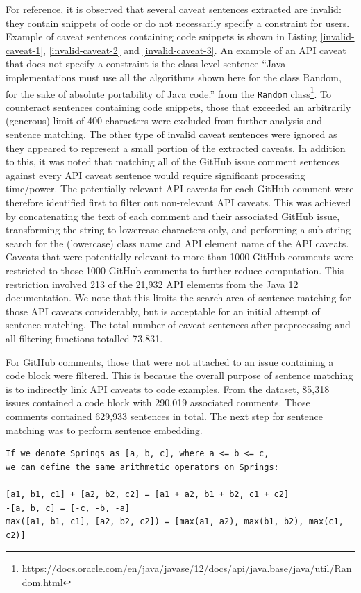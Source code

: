 For reference, it is observed that several caveat sentences extracted are invalid: they contain snippets of code or do not necessarily specify a constraint for users. Example of caveat sentences containing code snippets is shown in Listing \ref{invalid-caveat-1}, \ref{invalid-caveat-2} and \ref{invalid-caveat-3}. An example of an API caveat that does not specify a constraint is the class level sentence ``Java implementations must use all the algorithms shown here for the class Random, for the sake of absolute portability of Java code.'' from the \lstinline{Random} class\footnote{https://docs.oracle.com/en/java/javase/12/docs/api/java.base/java/util/Random.html}. To counteract sentences containing code snippets, those that exceeded an arbitrarily (generous) limit of 400 characters were excluded from further analysis and sentence matching. The other type of invalid caveat sentences were ignored as they appeared to represent a small portion of the extracted caveats.
In addition to this, it was noted that matching all of the GitHub issue comment sentences against every API caveat sentence would require significant processing time/power. The potentially relevant API caveats for each GitHub comment were therefore identified first to filter out non-relevant API caveats. This was achieved by concatenating the text of each comment and their associated GitHub issue, transforming the string to lowercase characters only, and performing a sub-string search for the (lowercase) class name and API element name of the API caveats. Caveats that were potentially relevant to more than 1000 GitHub comments were restricted to those 1000 GitHub comments to further reduce computation. This restriction involved 213 of the 21,932 API elements from the Java 12 documentation. We note that this limits the search area of sentence matching for those API caveats considerably, but is acceptable for an initial attempt of sentence matching. The total number of caveat sentences after preprocessing and all filtering functions totalled 73,831.\bigbreak

For GitHub comments, those that were not attached to an issue containing a code block were filtered. This is because the overall purpose of sentence matching is to indirectly link API caveats to code examples. From the dataset, 85,318 issues contained a code block with  290,019 associated comments. Those comments contained 629,933 sentences in total. The next step for sentence matching was to perform sentence embedding.

\clearpage
\begin{lstlisting}[label=invalid-caveat-1,caption={An example of a caveat sentence extracted from the \lstinline{javax.swing.Spring} documentation containing some snippets of code or mathematical expressions},float,frame=tb,numbers=none,language=None,linebackgroundcolor={\lstcolorlines{4,5,6}}]
If we denote Springs as [a, b, c], where a <= b <= c, 
we can define the same arithmetic operators on Springs:

[a1, b1, c1] + [a2, b2, c2] = [a1 + a2, b1 + b2, c1 + c2]
-[a, b, c] = [-c, -b, -a]
max([a1, b1, c1], [a2, b2, c2]) = [max(a1, a2), max(b1, b2), max(c1, c2)]
\end{lstlisting}

